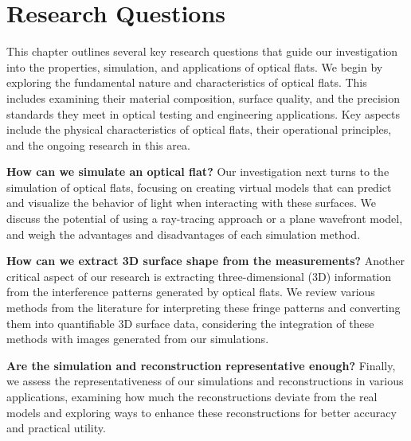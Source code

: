 \documentclass[../main.tex]{subfiles}
\begin{document}
{\let\clearpage\relax\chapter{Research Questions}}
This chapter outlines several key research questions that guide our investigation into the properties, simulation, and applications of optical flats. We begin by exploring the fundamental nature and characteristics of optical flats. This includes examining their material composition, surface quality, and the precision standards they meet in optical testing and engineering applications. Key aspects include the physical characteristics of optical flats, their operational principles, and the ongoing research in this area.

\textbf{How can we simulate an optical flat?} Our investigation next turns to the simulation of optical flats, focusing on creating virtual models that can predict and visualize the behavior of light when interacting with these surfaces. We discuss the potential of using a ray-tracing approach or a plane wavefront model, and weigh the advantages and disadvantages of each simulation method.

\textbf{How can we extract 3D surface shape from the measurements?} Another critical aspect of our research is extracting three-dimensional (3D) information from the interference patterns generated by optical flats. We review various methods from the literature for interpreting these fringe patterns and converting them into quantifiable 3D surface data, considering the integration of these methods with images generated from our simulations.

\textbf{Are the simulation and reconstruction representative enough?} Finally, we assess the representativeness of our simulations and reconstructions in various applications, examining how much the reconstructions deviate from the real models and exploring ways to enhance these reconstructions for better accuracy and practical utility.
\end{document}
